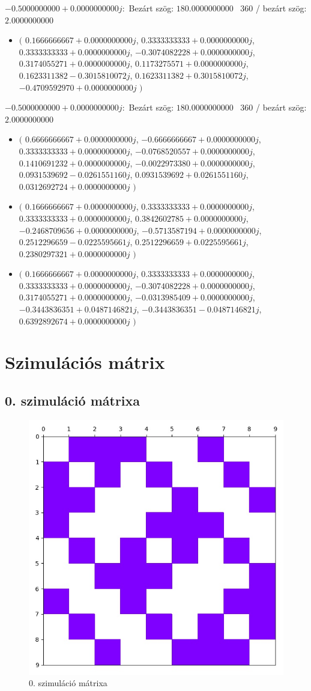 \documentclass[14pt,a4paper]{article}
\begin{document}
$-0.5000000000+0.0000000000j$:\
Bezárt szög: $180.0000000000$ \
360 / bezárt szög: $2.0000000000$\
\begin{itemize}
\item
$\big($
$0.1666666667+0.0000000000j$, $0.3333333333+0.0000000000j$, $0.3333333333+0.0000000000j$, $-0.3074082228+0.0000000000j$, $0.3174055271+0.0000000000j$, $0.1173275571+0.0000000000j$, $0.1623311382-0.3015810072j$, $0.1623311382+0.3015810072j$, $-0.4709592970+0.0000000000j$
$\big)$
\end{itemize}
$-0.5000000000+0.0000000000j$:\
Bezárt szög: $180.0000000000$ \
360 / bezárt szög: $2.0000000000$\
\begin{itemize}
\item
$\big($
$0.6666666667+0.0000000000j$, $-0.6666666667+0.0000000000j$, $0.3333333333+0.0000000000j$, $-0.0768520557+0.0000000000j$, $0.1410691232+0.0000000000j$, $-0.0022973380+0.0000000000j$, $0.0931539692-0.0261551160j$, $0.0931539692+0.0261551160j$, $0.0312692724+0.0000000000j$
$\big)$
\item
$\big($
$0.1666666667+0.0000000000j$, $0.3333333333+0.0000000000j$, $0.3333333333+0.0000000000j$, $0.3842602785+0.0000000000j$, $-0.2468709656+0.0000000000j$, $-0.5713587194+0.0000000000j$, $0.2512296659-0.0225595661j$, $0.2512296659+0.0225595661j$, $0.2380297321+0.0000000000j$
$\big)$
\item
$\big($
$0.1666666667+0.0000000000j$, $0.3333333333+0.0000000000j$, $0.3333333333+0.0000000000j$, $-0.3074082228+0.0000000000j$, $0.3174055271+0.0000000000j$, $-0.0313985409+0.0000000000j$, $-0.3443836351+0.0487146821j$, $-0.3443836351-0.0487146821j$, $0.6392892674+0.0000000000j$
$\big)$
\end{itemize}
\section{Szimulációs mátrix}
\subsection{0. szimuláció mátrixa}
\begin{figure}[H]
\centering
\includegraphics[width = 0.7\columnwidth]{sim_00/simulation_matrix.jpg}
\caption{0. szimuláció mátrixa}
\end{figure}
\end{document}
